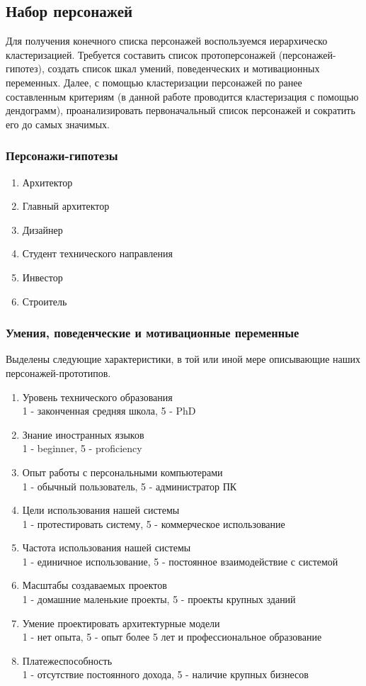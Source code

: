 \documentclass[a4paper,14pt]{extreport} %
\begin{document}
\subsection{Набор персонажей}

Для получения конечного списка персонажей воспользуемся иерархическо кластеризацией. Требуется составить список протоперсонажей (персонажей-гипотез), создать список шкал умений, поведенческих и мотивационных переменных. Далее, с помощью кластеризации персонажей по ранее составленным критериям (в данной работе проводится кластеризация с помощью дендограмм), проанализировать первоначальный список персонажей и сократить его до самых значимых.

\subsubsection{Персонажи-гипотезы}
\begin{enumerate}
\item Архитектор
\item Главный архитектор
\item Дизайнер
\item Студент технического направления
\item Инвестор
\item Строитель
\end {enumerate}

\subsubsection{Умения, поведенческие и мотивационные переменные}

Выделены следующие характеристики, в той или иной мере описывающие наших персонажей-прототипов.
\begin{enumerate}
\item Уровень технического образования \\
1 - законченная средняя школа, 5 - PhD
\item Знание иностранных языков \\
1 - beginner, 5 - proficiency
\item Опыт работы с персональными компьютерами \\
1 - обычный пользователь, 5 - администратор ПК
\item Цели использования нашей системы \\
1 - протестировать систему, 5 - коммерческое использование
\item Частота использования нашей системы \\
1 - единичное использование, 5 - постоянное взаимодействие с системой
\item Масштабы создаваемых проектов \\
1 - домашние маленькие проекты, 5 - проекты крупных зданий
\item Умение проектировать архитектурные модели \\
1 - нет опыта, 5 - опыт более 5 лет и профессиональное образование
\item Платежеспособность \\
1 - отсутствие постоянного дохода, 5 - наличие крупных бизнесов
\end{enumerate}
\end{document}
